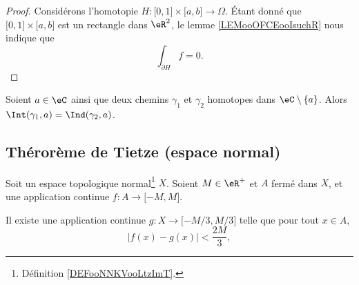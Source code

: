 \begin{proof}
    Considérons l'homotopie \( H\colon \mathopen[ 0 , 1 \mathclose]\times \mathopen[ a , b \mathclose]\to \Omega\). Étant donné que \( \mathopen[ 0 ,1  \mathclose]\times \mathopen[ a , b \mathclose]\) est un rectangle dans \( \eR^2\), le lemme \ref{LEMooOFCEooIsuchR} nous indique que 
    \begin{equation}
        \int_{\partial H}f=0.
    \end{equation}
\end{proof}

\begin{corollary}   \label{CorGZXzuZR}
	Soient \( a\in \eC\) ainsi que deux chemins \( \gamma_1\) et \( \gamma_2\) homotopes dans \( \eC\setminus\{ a \}\). Alors \( \Int(\gamma_1,a)=\Ind(\gamma_2,a)\).
\end{corollary}



\subsection{Thérorème de Tietze (espace normal)}

\begin{lemma}     \label{LEMooCLVAooTaNGJk}
    Soit un espace topologique normal\footnote{Définition \ref{DEFooNNKVooLtzImT}.} \( X\). Soient \( M\in \eR^+\) et \( A\) fermé dans \( X\), et une application continue \( f\colon A\to \mathopen[ -M , M \mathclose]\).

    Il existe une application continue \( g\colon X\to \mathopen[ -M/3 , M/3 \mathclose]\) telle que pour tout \( x\in A\),
            \begin{equation}
                | f(x)-g(x) |<\frac{ 2M }{ 3 },
            \end{equation}
\end{lemma}

